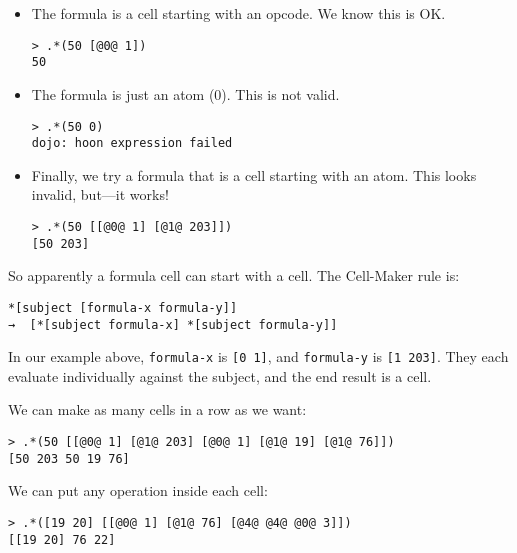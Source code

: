\documentclass[twoside]{article}
\begin{document}
\begin{itemize}

  \item  The formula is a cell starting with an opcode.  We know this is OK.

\begin{lstlisting}[style=listingblock]
> .*(50 [@0@ 1])
50
\end{lstlisting}

  \item  The formula is just an atom (0).  This is not valid.

\begin{lstlisting}[style=listingblock]
> .*(50 0)
dojo: hoon expression failed
\end{lstlisting}

  \item  Finally, we try a formula that is a cell starting with an atom.  This looks invalid, but—it works!

\begin{lstlisting}[style=listingblock]
> .*(50 [[@0@ 1] [@1@ 203]])
[50 203]
\end{lstlisting}

\end{itemize}

So apparently a formula cell can start with a cell. The Cell-Maker rule is:

\begin{lstlisting}[style=listingcode]
*[subject [formula-x formula-y]]
→  [*[subject formula-x] *[subject formula-y]]
\end{lstlisting}

In our example above, \lstinline[style=inlinecode]{formula-x} is \lstinline[style=inlinecode]{[0 1]}, and \lstinline[style=inlinecode]{formula-y} is \lstinline[style=inlinecode]{[1 203]}. They each evaluate individually against the subject, and the end result is a cell.

We can make as many cells in a row as we want:

\begin{lstlisting}[style=listingblock]
> .*(50 [[@0@ 1] [@1@ 203] [@0@ 1] [@1@ 19] [@1@ 76]])
[50 203 50 19 76]
\end{lstlisting}

We can put any operation inside each cell:

\begin{lstlisting}[style=listingblock]
> .*([19 20] [[@0@ 1] [@1@ 76] [@4@ @4@ @0@ 3]])
[[19 20] 76 22]
\end{lstlisting}
\end{document}
